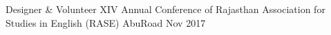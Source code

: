 

\begin{cvhonors}

    \cvhonor
    {Designer \& Volunteer} %
    {XIV Annual Conference of Rajasthan Association for Studies in English (RASE)} %
    {AbuRoad} %
    {Nov 2017} %

\end{cvhonors}

